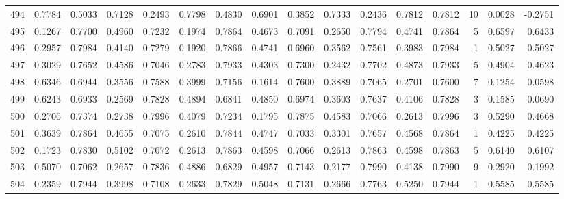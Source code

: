 \begin{tabular}{lrrrrrrrrrrrrrrr}
494 &      0.7784 &  0.5033 &  0.7128 &  0.2493 &  0.7798 &  0.4830 &  0.6901 &  0.3852 &  0.7333 &  0.2436 &   0.7812 &     0.7812 &     10 &                    0.0028 &                    -0.2751 \\
495 &      0.1267 &  0.7700 &  0.4960 &  0.7232 &  0.1974 &  0.7864 &  0.4673 &  0.7091 &  0.2650 &  0.7794 &   0.4741 &     0.7864 &      5 &                    0.6597 &                     0.6433 \\
496 &      0.2957 &  0.7984 &  0.4140 &  0.7279 &  0.1920 &  0.7866 &  0.4741 &  0.6960 &  0.3562 &  0.7561 &   0.3983 &     0.7984 &      1 &                    0.5027 &                     0.5027 \\
497 &      0.3029 &  0.7652 &  0.4586 &  0.7046 &  0.2783 &  0.7933 &  0.4303 &  0.7300 &  0.2432 &  0.7702 &   0.4873 &     0.7933 &      5 &                    0.4904 &                     0.4623 \\
498 &      0.6346 &  0.6944 &  0.3556 &  0.7588 &  0.3999 &  0.7156 &  0.1614 &  0.7600 &  0.3889 &  0.7065 &   0.2701 &     0.7600 &      7 &                    0.1254 &                     0.0598 \\
499 &      0.6243 &  0.6933 &  0.2569 &  0.7828 &  0.4894 &  0.6841 &  0.4850 &  0.6974 &  0.3603 &  0.7637 &   0.4106 &     0.7828 &      3 &                    0.1585 &                     0.0690 \\
500 &      0.2706 &  0.7374 &  0.2738 &  0.7996 &  0.4079 &  0.7234 &  0.1795 &  0.7875 &  0.4583 &  0.7066 &   0.2613 &     0.7996 &      3 &                    0.5290 &                     0.4668 \\
501 &      0.3639 &  0.7864 &  0.4655 &  0.7075 &  0.2610 &  0.7844 &  0.4747 &  0.7033 &  0.3301 &  0.7657 &   0.4568 &     0.7864 &      1 &                    0.4225 &                     0.4225 \\
502 &      0.1723 &  0.7830 &  0.5102 &  0.7072 &  0.2613 &  0.7863 &  0.4598 &  0.7066 &  0.2613 &  0.7863 &   0.4598 &     0.7863 &      5 &                    0.6140 &                     0.6107 \\
503 &      0.5070 &  0.7062 &  0.2657 &  0.7836 &  0.4886 &  0.6829 &  0.4957 &  0.7143 &  0.2177 &  0.7990 &   0.4138 &     0.7990 &      9 &                    0.2920 &                     0.1992 \\
504 &      0.2359 &  0.7944 &  0.3998 &  0.7108 &  0.2633 &  0.7829 &  0.5048 &  0.7131 &  0.2666 &  0.7763 &   0.5250 &     0.7944 &      1 &                    0.5585 &                     0.5585 \\

\end{tabular}
